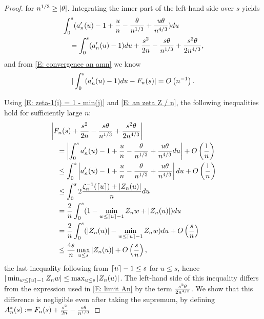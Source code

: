 \begin{proof}
	for $n^{1 / 3} \geq |\theta|$.
	Integrating the inner part of the left-hand side over $s$ yields
	\begin{equation}
	\begin{aligned}
	&\int_{0}^s (a'_n(u) - 1 + \frac{u}{n} - \frac{\theta}{n^{1 / 3}} + \frac{u\theta}{n^{4 / 3}}) du \\
	&\quad = \int_{0}^s(a'_n(u) - 1) du + \frac{s^2}{2n} - \frac{s\theta}{n^{1 / 3}} + \frac{s^2\theta}{2n^{4 / 3}},
	\end{aligned}
	\end{equation}
	and from \eqref{E: convergence an amn} we know
	\begin{equation} \label{E: convergence amn An}
	|\int_{0}^s(a'_n(u) - 1) du - F_n(s)| = O\left(n^{-1}\right).
	\end{equation}
	
	Using \eqref{E: zeta-1(i) = 1 - min(j)} and \eqref{E: an zeta Z / n}, the following inequalities hold for sufficiently large $n$:
	\begin{equation} \label{E: int an <= 4s/n maxZ + O()}
	\begin{aligned}
	&\left| F_n(s) + \frac{s^2}{2n} - \frac{s\theta}{n^{1 / 3}}  + \frac{s^2\theta}{2n^{4 / 3}}  \right| \\
	&\quad = \left| \int_{0}^s a'_n(u) - 1 + \frac{u}{n} - \frac{\theta}{n^{1 / 3}} + \frac{u\theta}{n^{4 / 3}} du \right| + O\left(\frac{1}{n}\right) \\
	&\quad \leq \int_{0}^s \left|a'_n(u) - 1 + \frac{u}{n} - \frac{\theta}{n^{1 / 3}} + \frac{u\theta}{n^{4 / 3}} \right| du + O\left(\frac{1}{n}\right) \\ 
	&\quad \leq \int_{0}^s 2 \frac{\zeta^{-1}_n(\lceil u\rceil) + |Z_n(u)|}{n} du \\ 
	&\quad = \frac{2}{n}  \int_{0}^s (1-\min_{w \leq \lceil u\rceil-1} Z_n{w}  + |Z_n(u)| )du \\ 
	&\quad = \frac{2}{n}  \int_{0}^s (|Z_n(u)| - \min_{w \leq \lceil u\rceil-1} Z_n{w}) du + O\left(\frac{s}{n}\right) \\ 
	&\quad \leq \frac{4s}{n} \max_{u \leq s} |Z_n(u)| + O\left(\frac{s}{n}\right),
	\end{aligned}
	\end{equation}
    the last inequality following from $\lceil u\rceil-1 \leq s$ for $u\leq s$, hence $|\min_{w \leq \lceil u\rceil-1}Z_n{w}| \leq \max_{u \leq s}|Z_n(u)|$.
    The left-hand side of this inequality differs from the expression used in \eqref{E: limit An} by the term $\frac{s^2\theta}{2n^{4 / 3}}$.
    We show that this difference is negligible even after taking the supremum, by defining $A^*_n(s) := F_n(s) + \frac{s^2}{2n} - \frac{s\theta}{n^{1 / 3}}$

\end{proof}
